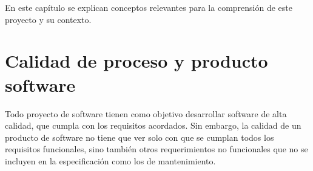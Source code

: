%	
%
%
%
En este capítulo se explican conceptos relevantes para la comprensión de este proyecto y su contexto.
\section{Calidad de proceso y producto software}
Todo proyecto de software tienen como objetivo desarrollar software de alta calidad, que cumpla con los requisitos acordados. Sin embargo, la calidad de un producto de software no tiene que ver solo con que se cumplan todos los requisitos funcionales, sino también otros requerimientos no funcionales que no se incluyen en la especificación como los de mantenimiento.

